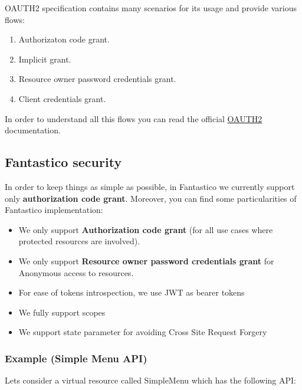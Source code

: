 \documentclass[letterpaper,10pt,english]{sphinxmanual}
\begin{document}
OAUTH2 specification contains many scenarios for its usage and provide various flows:
\begin{enumerate}
\item {} 
Authorizaton code grant.

\item {} 
Implicit grant.

\item {} 
Resource owner password credentials grant.

\item {} 
Client credentials grant.

\end{enumerate}

In order to understand all this flows you can read the official \href{http://tools.ietf.org/pdf/rfc6749.pdf}{OAUTH2}
documentation.


\subsection{Fantastico security}
\label{features/oauth2:fantastico-security}
In order to keep things as simple as possible, in Fantastico we currently support only \textbf{authorization code grant}. Moreover,
you can find some particularities of Fantastico implementation:
\begin{itemize}
\item {} 
We only support \textbf{Authorization code grant} (for all use cases where protected resources are involved).

\item {} 
We only support \textbf{Resource owner password credentials grant} for Anonymous access to resources.

\item {} 
For ease of tokens introspection, we use JWT as bearer tokens

\item {} 
We fully support scopes

\item {} 
We support state parameter for avoiding Cross Site Request Forgery

\end{itemize}


\subsubsection{Example (Simple Menu API)}
\label{features/oauth2/simple_api_example::doc}\label{features/oauth2/simple_api_example:example-simple-menu-api}
Lets consider a virtual resource called SimpleMenu which has the following API:
\end{document}

